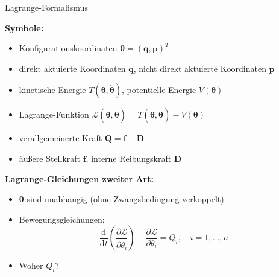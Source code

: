 \documentclass[
	ngerman,
	10pt,				%
	aspectratio=169 	%
]{beamer}
\begin{document}
\begin{frame}[t,fragile,label=Lagrange2_1]{\large Lagrange-Formalismus}
	
	\textbf{Symbole:}
	\begin{itemize}
		\item Konfigurationskoordinaten $\boldsymbol{\theta} = (\mathbf{q}, \mathbf{p})^T$
		\pause
		\item direkt aktuierte Koordinaten $\mathbf{q}$, nicht direkt aktuierte Koordinaten $\mathbf{p}$
		\pause
		\item kinetische Energie $T(\boldsymbol{\theta}, \dot{\boldsymbol{\theta}})$, potentielle Energie $V(\boldsymbol{\theta})$
		\pause
		\item Lagrange-Funktion $\mathcal{L}(\boldsymbol{\theta}, \dot{\boldsymbol{\theta}}) = T(\boldsymbol{\theta}, \dot{\boldsymbol{\theta}}) - V(\boldsymbol{\theta})$
		\pause
		\item verallgemeinerte Kraft $\mathbf{Q} = \mathbf{f} - \mathbf{D}$
		\pause
		\item äußere Stellkraft $\mathbf{f}$, interne Reibungskraft $\mathbf{D}$
	\end{itemize}
	
	\pause
	\bigskip
	\textbf{Lagrange-Gleichungen zweiter Art:}
	\begin{itemize}
		\pause
		\item  $\boldsymbol{\theta}$ sind unabhängig (ohne Zwangsbedingung verkoppelt)
		\pause
		\item Bewegungsgleichungen:
		\begin{equation*}
			\frac{\mathrm{d}}{\mathrm{d} t} \left(\frac{\partial \mathcal{L}}{\partial \dot{\theta}_i} \right) - \frac{\partial \mathcal{L}}{\partial \theta_i} = Q_i, \quad i = 1, \ldots, n
		\end{equation*}
		\pause
		\item Woher $Q_i$?
	\end{itemize}
	
\end{frame}

\end{document}
